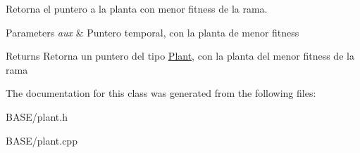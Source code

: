 Retorna el puntero a la planta con menor fitness de la rama. 


\begin{DoxyParams}{Parameters}
{\em aux} & Puntero temporal, con la planta de menor fitness\\
\hline
\end{DoxyParams}
\begin{DoxyReturn}{Returns}
Retorna un puntero del tipo \hyperlink{class_plant}{Plant}, con la planta del menor fitness de la rama 
\end{DoxyReturn}


The documentation for this class was generated from the following files\+:\begin{DoxyCompactItemize}
\item 
B\+A\+S\+E/plant.\+h\item 
B\+A\+S\+E/plant.\+cpp\end{DoxyCompactItemize}
